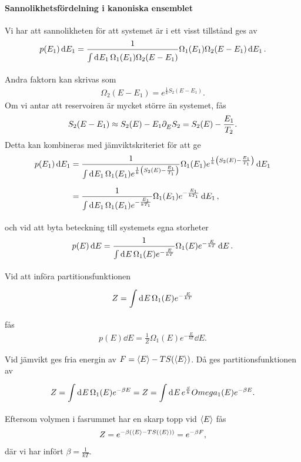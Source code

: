 \paragraph{Sannolikhetsfördelning i kanoniska ensemblet}
Vi har att sannolikheten för att systemet är i ett visst tillstånd ges av
\begin{align*}
	p(E_{1})\dd{E_{1}} = \frac{1}{\int\limits_{}^{}\dd[]{E_{1}}\Omega_{1}(E_{1})\Omega_{2}(E - E_{1})}\Omega_{1}(E_{1})\Omega_{2}(E - E_{1})\dd{E_{1}}.
\end{align*}
Andra faktorn kan skrivas som
\begin{align*}
	\Omega_{2}(E - E_{1}) = e^{\frac{1}{k}S_{2}(E - E_{1})}.
\end{align*}
Om vi antar att reservoiren är mycket större än systemet, fås
\begin{align*}
	S_{2}(E - E_{1}) \approx S_{2}(E) - E_{1}\partial_{E}^{}S_{2} = S_{2}(E) - \frac{E_{1}}{T_{2}}.
\end{align*}
Detta kan kombineras med jämviktskriteriet för att ge
\begin{align*}
	p(E_{1})\dd{E_{1}} &= \frac{1}{\int\limits_{}^{}\dd[]{E_{1}}\Omega_{1}(E_{1})e^{\frac{1}{k}\left(S_{2}(E) - \frac{E_{1}}{T_{1}}\right)}}\Omega_{1}(E_{1})e^{\frac{1}{k}\left(S_{2}(E) - \frac{E_{1}}{T_{1}}\right)}\dd{E_{1}} \\
	                   &= \frac{1}{\int\limits_{}^{}\dd[]{E_{1}}\Omega_{1}(E_{1})e^{-\frac{E_{1}}{kT_{1}}}}\Omega_{1}(E_{1})e^{-\frac{E_{1}}{kT_{1}}}\dd{E_{1}},
\end{align*}
och vid att byta beteckning till systemets egna storheter
\begin{align*}
	p(E)\dd{E} = \frac{1}{\int\limits_{}^{}\dd[]{E}\Omega_{1}(E)e^{-\frac{E}{kT}}}\Omega_{1}(E)e^{-\frac{E}{kT}}\dd{E}.
\end{align*}
Vid att införa partitionsfunktionen
\begin{align*}
	Z = \int\limits_{}^{}\dd[]{E}\Omega_{1}(E)e^{-\frac{E}{kT}}
\end{align*}
fås
\begin{align*}
	p(E)\dd{E} = \frac{1}{Z}\Omega_{1}(E)e^{-\frac{E}{kT}}\dd{E}.
\end{align*}

Vid jämvikt ges fria energin av $F = \expval{E} - TS(\expval{E})$. Då ges partitionsfunktionen av
\begin{align*}
	Z = \int\limits_{}^{}\dd[]{E}\Omega_{1}(E)e^{-\beta E} = Z = \int\limits_{}^{}\dd[]{E}e^{\frac{S}{k}}Omega_{1}(E)e^{-\beta E}.
\end{align*}
Eftersom volymen i fasrummet har en skarp topp vid $\expval{E}$ fås
\begin{align*}
	Z = e^{-\beta(\expval{E} - TS(\expval{E}))} = e^{-\beta F},
\end{align*}
där vi har infört $\beta = \frac{1}{kT}$.

